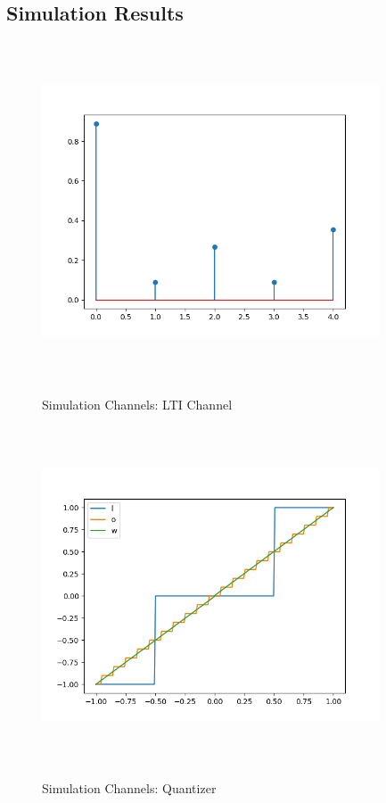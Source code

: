 \documentclass[12pt,a4paper]{article}
\begin{document}
\subsection{Simulation Results}

\begin{figure}[H]
\centering
	  \caption{Simulation Channels: LTI Channel}
	\includegraphics[width=10cm,height = 10cm]{system_model/lti_channel}
	  \label{fig:LTI Channel}
\end{figure}
\begin{figure}[H]
\centering
	  \caption{Simulation Channels: Quantizer}
	\includegraphics[width=10cm,height = 10cm]{system_model/quantizer}
	  \label{fig:Quantized Channel}
\end{figure}
\end{document}
